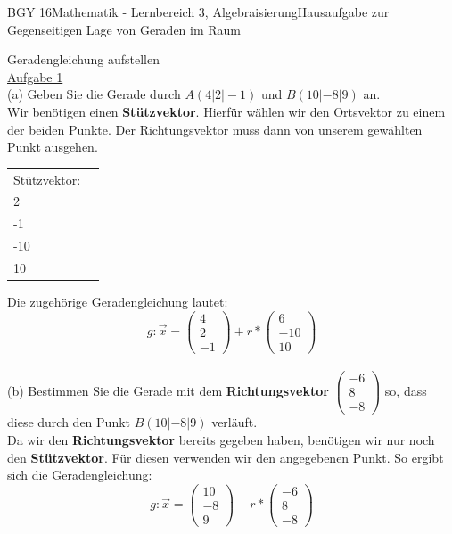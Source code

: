 \documentclass[oneside,openany,headings=optiontotoc,11pt,numbers=noenddot]{scrreprt}
\begin{document}
	\begin{worksheet}{BGY 16}{Mathematik - Lernbereich 3, Algebraisierung}{Hausaufgabe zur Gegenseitigen Lage von Geraden im Raum}
		
		\begin{framed}
			\noindent
			\tiny{\color{codegray}Geradengleichung aufstellen}\\
			\normalsize
			\noindent
			\underline{Aufgabe 1}\\(a) Geben Sie die Gerade durch \(A(4|2|-1)\) und \(B(10|-8|9)\) an.\\
			Wir benötigen einen \textbf{Stützvektor}. Hierfür wählen wir den Ortsvektor zu einem der beiden Punkte. Der Richtungsvektor muss dann von unserem gewählten Punkt ausgehen.\\
			\begin{tabularx}{\textwidth}{XX}
				Stützvektor: \(\vec{0A} = \left(\begin{array}{c}4\\2\\-1\end{array}\right)\) & \(\vec{AB} = \vec{B} - \vec{A} = \left(\begin{array}{c}6\\-10\\10\end{array}\right)\)
			\end{tabularx}
			Die zugehörige Geradengleichung lautet: \[g: \vec{x} =  \left(\begin{array}{c}4\\2\\-1\end{array}\right) + r*\left(\begin{array}{c}6\\-10\\10\end{array}\right)\]\\
			\noindent
			(b) Bestimmen Sie die Gerade mit dem \textbf{Richtungsvektor} \(\left(\begin{array}{c}-6\\8\\-8\end{array}\right)\) so, dass diese durch den Punkt \(B(10|-8|9)\) verläuft.\\
			Da wir den \textbf{Richtungsvektor} bereits gegeben haben, benötigen wir nur noch den \textbf{Stützvektor}. Für diesen verwenden wir den angegebenen Punkt. So ergibt sich die Geradengleichung:
			\[g: \vec{x} = \left(\begin{array}{c}10\\-8\\9\end{array}\right) + r*\left(\begin{array}{c}-6\\8\\-8\end{array}\right)\]\\

\end{framed}
\end{worksheet}
\end{document}

